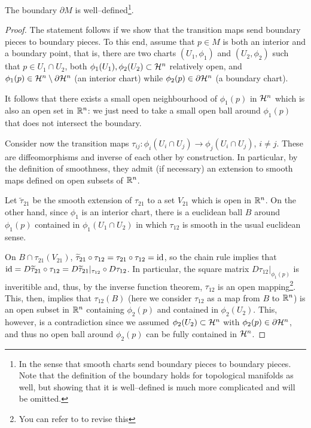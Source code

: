 \begin{proposition}\label{prop:bdwelldef}
  The boundary $\partial M$ is well--defined\footnote{In the sense that smooth charts send boundary pieces to boundary pieces. Note that the definition of the boundary holds for topological manifolds as well, but showing that it is well--defined is much more complicated and will be omitted.}.
\end{proposition}
\begin{proof}
  The statement follows if we show that the transition maps send boundary pieces to boundary pieces.
  To this end, assume that $p\in M$ is both an interior and a boundary point, that is, there are two charts $(U_1, \phi_1)$ and $(U_2,\phi_2)$ such that $p \in U_1\cap U_2$, both $\phi_1(U_1), \phi_2(U_2) \subset\mathcal{H}^n$ relatively open, and $\phi_1(p) \in \mathcal{H}^n\setminus\partial\mathcal{H}^n$ (an interior chart) while $\phi_2(p) \in \partial\mathcal{H}^n$ (a boundary chart).

  It follows that there exists a small open neighbourhood of $\phi_1(p)$ in $\mathcal{H}^n$ which is also an open set in $\mathbb{R}^n$: we just need to take a small open ball around $\phi_1(p)$ that does not intersect the boundary.

  Consider now the transition maps $\tau_{ij} : \phi_i(U_i\cap U_j) \to \phi_j(U_i\cap U_j)$, $i\neq j$.
  These are diffeomorphisms and inverse of each other by construction.
  In particular, by the definition of smoothness, they admit (if necessary) an extension to smooth maps defined on open subsets of $\mathbb{R}^n$.

  Let $\widetilde\tau_{21}$ be the smooth extension of $\tau_{21}$ to a set $V_{21}$ which is open in $\mathbb{R}^n$.
  On the other hand, since $\phi_1$ is an interior chart, there is a euclidean ball $B$ around $\phi_1(p)$ contained in $\phi_1(U_1\cap U_2)$ in which $\tau_{12}$ is smooth in the usual euclidean sense.

  On $B \cap \tau_{21}(V_21)$, $\widetilde\tau_{21} \circ \tau_{12} = \tau_{21} \circ \tau_{12} = \operatorname{id}$, so the chain rule implies that $\operatorname{id} = D \widetilde\tau_{21} \circ \tau_{12} = D\widetilde\tau_{21}|_{\tau_{12}} \circ D\tau_{12}$.
  In particular, the square matrix $D\tau_{12}|_{\phi_1(p)}$ is inveritible and, thus, by the inverse function theorem, $\tau_{12}$ is an open mapping\footnote{You can refer to \cite[Corollary C.36]{book:lee} to revise this}.
  This, then, implies that $\tau_{12}(B)$ (here we consider $\tau_{12}$ as a map from $B$ to $\mathbb{R}^n$) is an open subset in $\mathbb{R}^n$ containing $\phi_2(p)$ and contained in $\phi_2(U_2)$.
  This, however, is a contradiction since we assumed $\phi_2(U_2)\subset\mathcal{H}^n$ with $\phi_2(p) \in \partial\mathcal{H}^n$, and thus no open ball around $\phi_2(p)$ can be fully contained in $\mathcal{H}^n$.
\end{proof}

